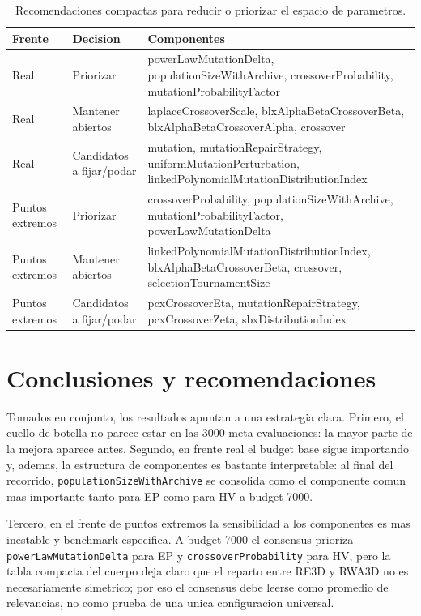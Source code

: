 \documentclass[11pt,a4paper]{article}
\begin{document}
{\scriptsize
\begin{table}[p]
\centering
\caption{Recomendaciones compactas para reducir o priorizar el espacio de parametros.}
\label{tab:parameter_recommendations}
\begin{tabular}{lll}
\toprule
Frente & Decision & Componentes \\
\midrule
Real & Priorizar & powerLawMutationDelta, populationSizeWithArchive, crossoverProbability, mutationProbabilityFactor \\
Real & Mantener abiertos & laplaceCrossoverScale, blxAlphaBetaCrossoverBeta, blxAlphaBetaCrossoverAlpha, crossover \\
Real & Candidatos a fijar/podar & mutation, mutationRepairStrategy, uniformMutationPerturbation, linkedPolynomialMutationDistributionIndex \\
Puntos extremos & Priorizar & crossoverProbability, populationSizeWithArchive, mutationProbabilityFactor, powerLawMutationDelta \\
Puntos extremos & Mantener abiertos & linkedPolynomialMutationDistributionIndex, blxAlphaBetaCrossoverBeta, crossover, selectionTournamentSize \\
Puntos extremos & Candidatos a fijar/podar & pcxCrossoverEta, mutationRepairStrategy, pcxCrossoverZeta, sbxDistributionIndex \\
\bottomrule
\end{tabular}
\end{table}

}

\section{Conclusiones y recomendaciones}

Tomados en conjunto, los resultados apuntan a una estrategia clara. Primero, el cuello de botella no parece estar en las 3000 meta-evaluaciones: la mayor parte de la mejora aparece antes. Segundo, en frente real el budget base sigue importando y, ademas, la estructura de componentes es bastante interpretable: al final del recorrido, \texttt{populationSizeWithArchive} se consolida como el componente comun mas importante tanto para EP como para HV a budget 7000.

Tercero, en el frente de puntos extremos la sensibilidad a los componentes es mas inestable y benchmark-especifica. A budget 7000 el consensus prioriza \texttt{powerLawMutationDelta} para EP y \texttt{crossoverProbability} para HV, pero la tabla compacta del cuerpo deja claro que el reparto entre RE3D y RWA3D no es necesariamente simetrico; por eso el consensus debe leerse como promedio de relevancias, no como prueba de una unica configuracion universal.
\end{document}
